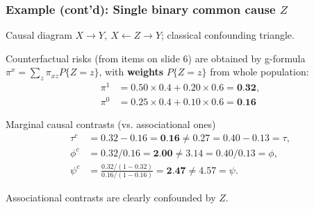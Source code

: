 \documentclass[12pt,dvipsnames,t,aspectratio=169, handout%
]{beamer}
\begin{document}
\begin{frame}
\frametitle{\large Example (cont'd): Single binary common cause $Z$}

\bi
\item Causal diagram $X \to Y, \ X \leftarrow Z \to Y$;  classical confounding triangle.
\pause
\medskip
\item 
Counterfactual risks (from items on slide 6) are obtained by g-formula
$ \pi^x = \sum_z \pi_{xz} P\{ Z=z\}$, with {\bf weights} $P\{ Z=z\}$ from whole population: 
\begin{align*}
  \pi^1 & = 0.50 \times 0.4 + 0.20 \times 0.6 = \textbf{0.32}, \\
	\pi^0 & = 0.25 \times 0.4 + 0.10 \times 0.6 = \textbf{0.16}
\end{align*}
\pause
\item
Marginal causal contrasts (vs. associational ones)
\begin{align*}
   \tau^c & = 0.32 - 0.16 = \textbf{0.16} \neq 0.27 = 0.40 - 0.13 =  \tau, \\
	 \phi^c & = 0.32/0.16 = \textbf{2.00} \neq 3.14 = 0.40/0.13 =  \phi, \\
	 \psi^c & = \frac{0.32/(1-0.32)}{0.16/(1-0.16)} = \textbf{2.47}
	                \neq 4.57 = \psi.
\end{align*}
\pause
\item
Associational contrasts are clearly confounded by $Z$.
\ei 

\end{frame}

\end{document}
